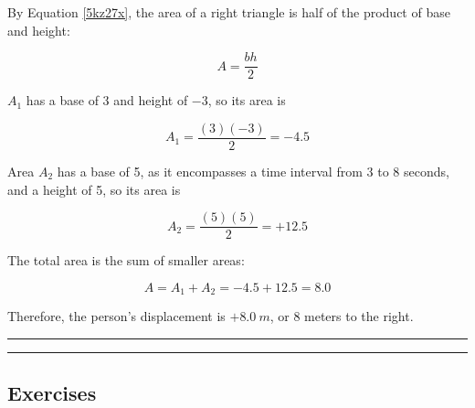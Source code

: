 \documentclass[dvipsnames]{article}
\begin{document}
\begin{center}
\end{center}

By Equation \eqref{5kz27x}, the area of a right triangle is half of the product of base and height:

\begin{equation*}
    A = \frac{bh}{2}
\end{equation*}

$A_1$ has a base of 3 and height of $-3$, so its area is

\begin{equation*}
    A_1 = \frac{(3)(-3)}{2} = -4.5
\end{equation*}

Area $A_2$ has a base of 5, as it encompasses a time interval from 3 to 8 seconds, and a height of 5, so its area is

\begin{equation*}
    A_2 = \frac{(5)(5)}{2} = +12.5
\end{equation*}

The total area is the sum of smaller areas:

\begin{equation*}
    A = A_1 + A_2 = -4.5 + 12.5 = 8.0
\end{equation*}

Therefore, the person's displacement is $+\SI{8.0}{m}$, or 8 meters to the right.

\hrule


\hrule

\subsection{Exercises}
\end{document}

